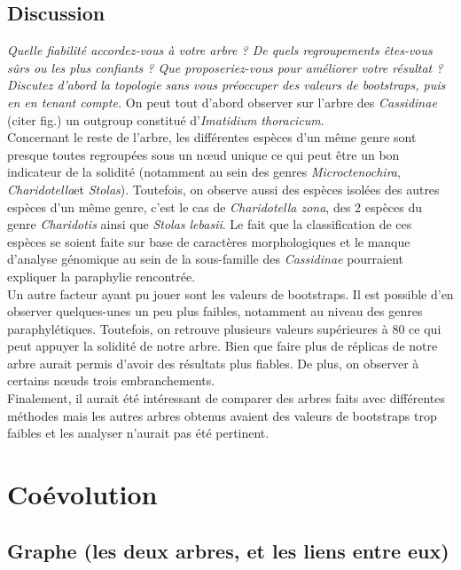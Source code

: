 \documentclass[a4paper, 12pt]{article}
\begin{document}
\subsection{Discussion}
\emph{Quelle fiabilité accordez-vous à votre arbre ? De quels regroupements êtes-vous sûrs ou les plus confiants ? Que proposeriez-vous pour améliorer votre résultat ?}
\emph{
Discutez d’abord la topologie sans vous préoccuper des valeurs de bootstraps, puis en en tenant compte.}
On peut tout d’abord observer sur l’arbre des \emph{Cassidinae} (citer fig.) un outgroup constitué d’\emph{Imatidium thoracicum}.\\
Concernant le reste de l’arbre, les différentes espèces d’un même genre sont presque toutes regroupées sous un nœud unique ce qui peut être un bon indicateur de la solidité (notamment au sein des genres \emph{Microctenochira}, \emph{Charidotella}et \emph{Stolas}). Toutefois, on observe aussi des espèces isolées des autres espèces d’un même genre, c’est le cas de \emph{Charidotella zona}, des 2 espèces du genre \emph{Charidotis} ainsi que \emph{Stolas lebasii}. Le fait que la classification de ces espèces se soient faite sur base de caractères morphologiques et le manque d’analyse génomique au sein de la sous-famille des \emph{Cassidinae} pourraient expliquer la paraphylie rencontrée.\\
Un autre facteur ayant pu jouer sont les valeurs de bootstraps. Il est possible d’en observer quelques-unes un peu plus faibles, notamment au niveau des genres paraphylétiques. Toutefois, on retrouve plusieurs valeurs supérieures à 80 ce qui peut appuyer la solidité de notre arbre. Bien que faire plus de réplicas de notre arbre aurait permis d’avoir des résultats plus fiables. De plus, on observer à certains nœuds trois embranchements.\\ 
Finalement, il aurait été intéressant de comparer des arbres faits avec différentes méthodes mais les autres arbres obtenus avaient des valeurs de bootstraps trop faibles et les analyser n’aurait pas été pertinent.


\section{Coévolution}

\subsection{Graphe (les deux arbres, et les liens entre eux)}
\end{document}
